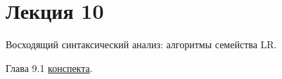 \section{Лекция 10}

Восходящий синтаксический анализ: алгоритмы семейства LR.


Глава 9.1 \href{https://github.com/YaccConstructor/articles/blob/master/InProgress/Formal_langs_CFPQ_course_notes/Formal_lang_CFPQ_course_notes.pdf}{конспекта}.
